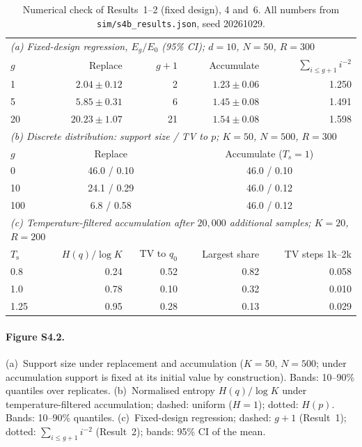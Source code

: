 \begin{table}[h]
\caption{Numerical check of Results~1--2 (fixed design), 4 and~6. All numbers
from \texttt{sim/s4b\_results.json}, seed 20261029.}
\label{tab:S4-2}
\small
\begin{tabular}{lrrrr}
\toprule
\multicolumn{5}{l}{\emph{(a) Fixed-design regression, $E_g/E_0$ (95\% CI);
  $d=10$, $N=50$, $R=300$}} \\
$g$ & Replace & $g+1$ & Accumulate & $\sum_{i\leq g+1}i^{-2}$ \\
\midrule
1  & $2.04\pm0.12$ & 2  & $1.23\pm0.06$ & 1.250 \\
5  & $5.85\pm0.31$ & 6  & $1.45\pm0.08$ & 1.491 \\
20 & $20.23\pm1.07$ & 21 & $1.54\pm0.08$ & 1.598 \\
\midrule
\multicolumn{5}{l}{\emph{(b) Discrete distribution: support size / TV to $p$;
  $K=50$, $N=500$, $R=300$}} \\
$g$ & \multicolumn{2}{c}{Replace} & \multicolumn{2}{c}{Accumulate ($T_s=1$)} \\
\midrule
0   & \multicolumn{2}{c}{46.0 / 0.10} & \multicolumn{2}{c}{46.0 / 0.10} \\
10  & \multicolumn{2}{c}{24.1 / 0.29} & \multicolumn{2}{c}{46.0 / 0.12} \\
100 & \multicolumn{2}{c}{\hphantom{2}6.8 / 0.58} &
    \multicolumn{2}{c}{46.0 / 0.12} \\
\midrule
\multicolumn{5}{l}{\emph{(c) Temperature-filtered accumulation after
  $20{,}000$ additional samples; $K=20$, $R=200$}} \\
$T_{\mathrm s}$ & $H(q)/\log K$ & TV to $q_0$ & Largest share
  & TV steps 1k--2k \\
\midrule
0.8  & 0.24 & 0.52 & 0.82 & 0.058 \\
1.0  & 0.78 & 0.10 & 0.32 & 0.010 \\
1.25 & 0.95 & 0.28 & 0.13 & 0.029 \\
\bottomrule
\end{tabular}
\end{table}

\paragraph{Figure S4.2.}
(a)~Support size under replacement and accumulation ($K=50$, $N=500$; under
accumulation support is fixed at its initial value by construction). Bands: 10--90\%
quantiles over replicates.
(b)~Normalised entropy $H(q)/\log K$ under temperature-filtered accumulation;
dashed: uniform ($H=1$); dotted: $H(p)$. Bands: 10--90\% quantiles.
(c)~Fixed-design regression; dashed: $g+1$ (Result~1); dotted:
$\sum_{i\leq g+1}i^{-2}$ (Result~2); bands: 95\% CI of the mean.
